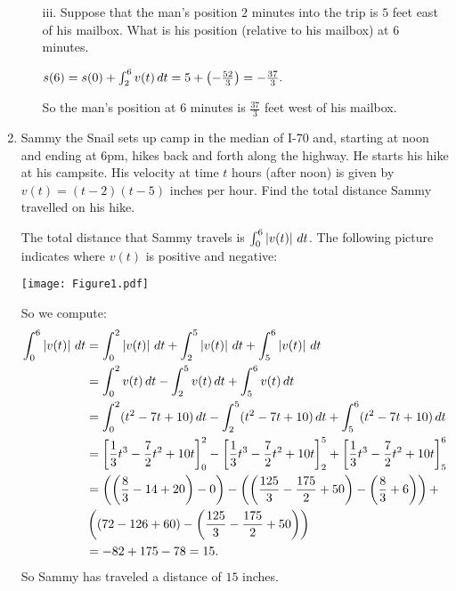 \documentclass[handout,nooutcomes]{ximera}
\begin{document}
\begin{problem}
\begin{enumerate}
\begin{enumerate}
		\item[iii.]  Suppose that the man's position $2$ minutes into the trip is $5$ feet east of his mailbox.  What is his position (relative to his mailbox) at $6$ minutes.
			\begin{freeResponse}
			$s(6) = s(0) + \int_2^6 v(t) \,d t = 5 + \left(- \frac{52}{3} \right) = - \frac{37}{3}. $
			
			So the man's position at $6$ minutes is $\frac{37}{3}$ feet west of his mailbox.
			\end{freeResponse}
				
		\end{enumerate}
		
		
		
	\item  Sammy the Snail sets up camp in the median of I-70 and, starting at noon and ending at 6pm, hikes back and forth along the highway.  He starts his hike at his campsite.  His velocity at time $t$ hours (after noon)  is given by $v(t)=(t-2)(t-5)$ inches per hour.  Find the total distance Sammy travelled on his hike.  
		\begin{freeResponse}
		The total distance that Sammy travels is $\int_0^6 \left| v(t) \right| \,d t$.  
		The following picture indicates where $v(t)$ is positive and negative:
			\begin{image}
			\texttt{[image: Figure1.pdf]}
			\end{image}
		So we compute:
			\begin{align*}
			\int_0^6 \left| v(t) \right| \,d t &= \int_0^2 \left| v(t) \right| \,d t + \int_2^5 \left| v(t) \right| \,d t + \int_5^6 \left| v(t) \right| \,d t  \\
			&= \int_0^2 v(t) \,d t - \int_2^5 v(t) \,d t + \int_5^6 v(t) \,d t  \\
			&= \int_0^2 (t^2 - 7t + 10) \,d t - \int_2^5 (t^2 - 7t + 10) \,d t + \int_5^6 (t^2 - 7t + 10) \,d t  \\
			&= \bigg[ \frac{1}{3}t^3-\frac{7}{2}t^2+10t \bigg]_0^2-\bigg[ \frac{1}{3}t^3-\frac{7}{2}t^2+10t \bigg]_2^5+\bigg[ \frac{1}{3}t^3-\frac{7}{2}t^2+10t \bigg]_5^6  \\
			&= \left( \left(\frac{8}{3}-14+20 \right)-0\right)-\left( \left( \frac{125}{3}-\frac{175}{2}+50 \right)-\left( \frac{8}{3}+6 \right) \right)+  \\
			&\left( \left( 72-126+60 \right) - \left( \frac{125}{3} - \frac{175}{2} + 50 \right) \right)  \\
			&= -82+175-78=15.
			\end{align*}
		So Sammy has traveled a distance of $15$ inches.
		\end{freeResponse}
		
		
		
	\end{enumerate}
		
		
\end{problem}
\end{document}
